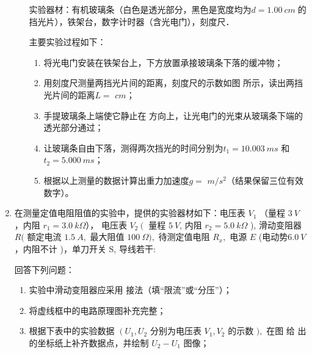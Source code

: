 \begin{enumerate}
\begin{enumerate}
实验器材：有机玻璃条（白色是透光部分，黑色是宽度均为$ d=1.00 \ cm $的挡光片），铁架台，数字计时器（含光电门），刻度尺． 

主要实验过程如下： 

\begin{enumerate}
\item
将光电门安装在铁架台上，下方放置承接玻璃条下落的缓冲物；

\item 
用刻度尺测量两挡光片间的距离，刻度尺的示数如图  所示，读出两挡光片间的距离$ L= $ \underlinegap $ cm $； 

\item 
手提玻璃条上端使它静止在 \underlinegap 方向上，让光电门的光束从玻璃条下端的透光部分通过； 

\item 
让玻璃条自由下落，测得两次挡光的时间分别为$t_{1}=10.003 \ ms$ 和 $t_{2}=5.000 \ ms$；

\item 
根据以上测量的数据计算出重力加速度$ g= $ \underlinegap $ m/s^{2} $（结果保留三位有效数字）。


\end{enumerate}







\end{enumerate}


\item 
在测量定值电阻阻值的实验中，提供的实验器材如下：电压表 $V_{1}$ （量程 $3 \ V$ ，内阻
$r_{1}=3.0 \ k \Omega$）， 电压表 $V_{2}\left(\right.$ 量程 $5 \ V$, 内阻 $r_{2}=5.0 \ k \Omega$ ), 滑动变阻器 $R($ 额定电流 $1.5 \ A,$
最大阻值 $100 \ \Omega),$ 待测定值电阻 $R_{x},$ 电源 $E$ (电动势$ 6.0 \ V $，内阻不计 )，单刀开关 S, 导线若干:

回答下列问题： 
\begin{enumerate}
\item
实验中滑动变阻器应采用 \underlinegap 接法（填“限流”或“分压”）； 


\item 
将虚线框中的电路原理图补充完整；
\begin{figure}[h!]
\centering

\end{figure}

\item 
根据下表中的实验数据 $\left(U_{1}, U_{2}\right.$ 分别为电压表 $V_{1}, V_{2}$ 的示数 $),$ 在图  给
出的坐标纸上补齐数据点，并绘制 $U_{2}-U_{1}$ 图像；




\end{enumerate}
\end{enumerate}
